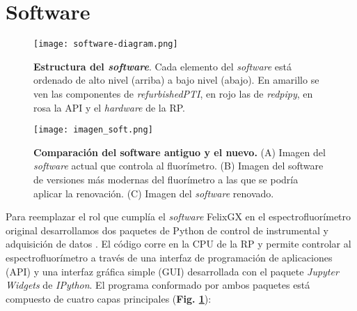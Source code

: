 
\renewcommand{\tablename}{\textbf{Tabla}}

\section{Software} \label{sec:software}

\begin{figure}[t]
     \centering
     \texttt{[image: software-diagram.png]}
     \caption{\textbf{Estructura del \textit{software}}. Cada elemento del \textit{software} está ordenado de alto nivel (arriba) a bajo nivel (abajo). En amarillo se ven las componentes de \textit{refurbishedPTI}, en rojo las de \textit{redpipy}, en rosa la API y el \textit{hardware} de la RP.}
     \label{fig:code}
\end{figure}

\begin{figure}
    \centering
    \texttt{[image: imagen\_soft.png]}
    \caption{\textbf{Comparación del software antiguo y el nuevo.} (A) Imagen del \textit{software} actual que controla al fluorímetro. (B) Imagen del software de versiones más modernas del fluorímetro a las que se podría aplicar la renovación. (C) Imagen del \textit{software} renovado.}
    \label{fig:imagen_soft}
\end{figure}

Para reemplazar el rol que cumplía el \textit{software} FelixGX en el espectrofluorímetro original desarrollamos dos paquetes de Python de control de instrumental y adquisición de datos \cite{napoli_tdinapoli_2024,grecco_hgrecco_2024}.
El código corre en la CPU de la RP y permite controlar al espectrofluorímetro a través de una interfaz de programación de aplicaciones (API) y una interfaz gráfica simple (GUI) desarrollada con el paquete \textit{Jupyter Widgets} de \textit{IPython}.
El programa conformado por ambos paquetes está compuesto de cuatro capas principales (\textbf{Fig. \ref{fig:code}}):

